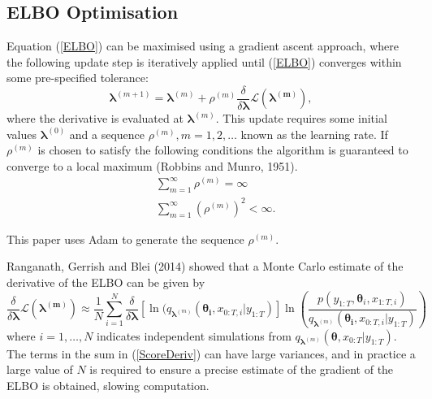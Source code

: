 \documentclass[12pt,a4paper]{article}%
\numberwithin{equation}{section}
\begin{document}
\subsection{ELBO Optimisation}
Equation (\ref{ELBO}) can be maximised using a gradient ascent approach, where the following update step is iteratively applied until (\ref{ELBO}) converges within some pre-specified tolerance:
\begin{equation}
\label{GradAscent}
\boldsymbol{\lambda}^{(m+1)} = \boldsymbol{\lambda}^{(m)} + \rho^{(m)} \frac{\delta}{\delta\boldsymbol{\lambda}} \mathcal{L}(\boldsymbol{\lambda^{(m)}}),
\end{equation}
where the derivative is evaluated at $\boldsymbol{\lambda}^{(m)}$. This update requires some initial values $\boldsymbol{\lambda}^{(0)}$ and a sequence $\rho^{(m)}, m = 1, 2, \dots$ known as the learning rate. If $\rho^{(m)}$ is chosen to satisfy the following conditions the algorithm is guaranteed to converge to a local maximum (Robbins and Munro, 1951).
\begin{align}
&\sum_{m=1}^{\infty} \rho^{(m)} =  \infty \\
&\sum_{m=1}^{\infty} (\rho^{(m)})^2 <  \infty.
\end{align}

This paper uses Adam \citep{Kingma2015b} to generate the sequence $\rho^{(m)}$.

Ranganath, Gerrish and Blei (2014) showed that a Monte Carlo estimate of the derivative of the ELBO can be given by
\begin{equation}
\label{ScoreDeriv}
\frac{\delta}{\delta\boldsymbol{\lambda}}\mathcal{L}(\boldsymbol{\lambda^{(m)}}) \approx \frac{1}{N}\sum_{i=1}^{N} \frac{\delta}{\delta\boldsymbol{\lambda}} [\ln(q_{\boldsymbol{\lambda}^{(m)}}(\boldsymbol{\theta_i}, x_{0:T, i} | y_{1:T})] \ln \left(\frac{p(y_{1:T}, \boldsymbol{\theta}_i, x_{1:T, i})}{q_{\boldsymbol{\lambda}^{(m)}}(\boldsymbol{\theta_i}, x_{0:T, i} | y_{1:T})} \right) 
\end{equation}
where $i = 1, \dots, N$ indicates independent simulations from $q_{\boldsymbol{\lambda}^{(m)}}(\boldsymbol{\theta}, x_{0:T} | y_{1:T})$. 
The terms in the sum in (\ref{ScoreDeriv}) can have large variances, and in practice a large value of $N$ is required to ensure a precise estimate of the gradient of the ELBO is obtained, slowing computation. 
\end{document}
